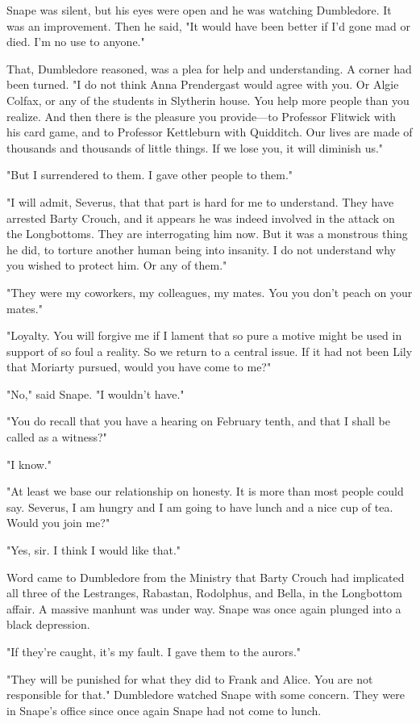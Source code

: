 Snape was silent, but his eyes were open and he was watching Dumbledore. It was an improvement. Then he said, "It would have been better if I'd gone mad or died. I'm no use to anyone."

That, Dumbledore reasoned, was a plea for help and understanding. A corner had been turned. "I do not think Anna Prendergast would agree with you. Or Algie Colfax, or any of the students in Slytherin house. You help more people than you realize. And then there is the pleasure you provide—to Professor Flitwick with his card game, and to Professor Kettleburn with Quidditch. Our lives are made of thousands and thousands of little things. If we lose you, it will diminish us."

"But I surrendered to them. I gave other people to them."

"I will admit, Severus, that that part is hard for me to understand. They have arrested Barty Crouch, and it appears he was indeed involved in the attack on the Longbottoms. They are interrogating him now. But it was a monstrous thing he did, to torture another human being into insanity. I do not understand why you wished to protect him. Or any of them."

"They were my coworkers, my colleagues, my mates. You{\el} you don't peach on your mates."

"Loyalty. You will forgive me if I lament that so pure a motive might be used in support of so foul a reality. So we return to a central issue. If it had not been Lily that Moriarty pursued, would you have come to me?"

"No," said Snape. "I wouldn't have."

"You do recall that you have a hearing on February tenth, and that I shall be called as a witness?"

"I know."

"At least we base our relationship on honesty. It is more than most people could say. Severus, I am hungry and I am going to have lunch and a nice cup of tea. Would you join me?"

"Yes, sir. I think I would like that."

Word came to Dumbledore from the Ministry that Barty Crouch had implicated all three of the Lestranges, Rabastan, Rodolphus, and Bella, in the Longbottom affair. A massive manhunt was under way. Snape was once again plunged into a black depression.

"If they're caught, it's my fault. I gave them to the aurors."

"They will be punished for what they did to Frank and Alice. You are not responsible for that." Dumbledore watched Snape with some concern. They were in Snape's office since once again Snape had not come to lunch.

